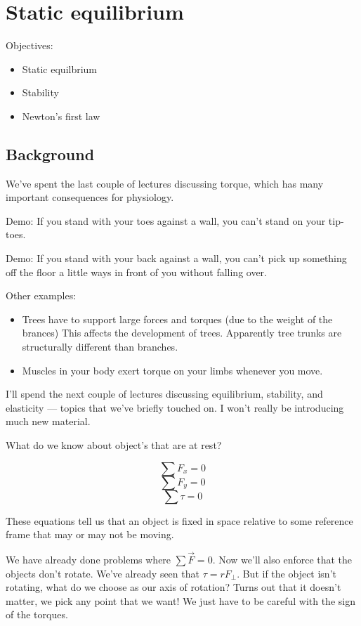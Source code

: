 \section{Static equilibrium}
Objectives:
\begin{itemize}
\item Static equilbrium
\item Stability
\item Newton's first law
\end{itemize}

\subsection{Background}
We've spent the last couple of lectures discussing torque, which has many important consequences for physiology.

Demo: If you stand with your toes against a wall, you can't stand on your tip-toes.

Demo: If you stand with your back against a wall, you can't pick up something off the floor a little ways in front of you without falling over.

Other examples:
\begin{itemize}
\itemsep 0pt
\item Trees have to support large forces and torques (due to the weight of the brances) This affects the development of trees. Apparently tree trunks are structurally different than branches.
\item Muscles in your body exert torque on your limbs whenever you move.
\end{itemize}

I'll spend the next couple of lectures discussing equilibrium, stability, and elasticity --- topics that we've briefly touched on. I won't really be introducing much new material.

What do we know about object's that are at rest?

$$\sum F_x = 0$$
$$\sum F_y = 0$$
$$\sum \tau = 0$$

These equations tell us that an object is fixed in space relative to some reference frame that may or may not be moving.

We have already done problems where $\sum \vec{F}=0$. Now we'll also enforce that the objects don't rotate. We've already seen that $\tau=rF_\perp$. But if the object isn't rotating, what do we choose as our axis of rotation? Turns out that it doesn't matter, we pick any point that we want! We just have to be careful with the sign of the torques.



